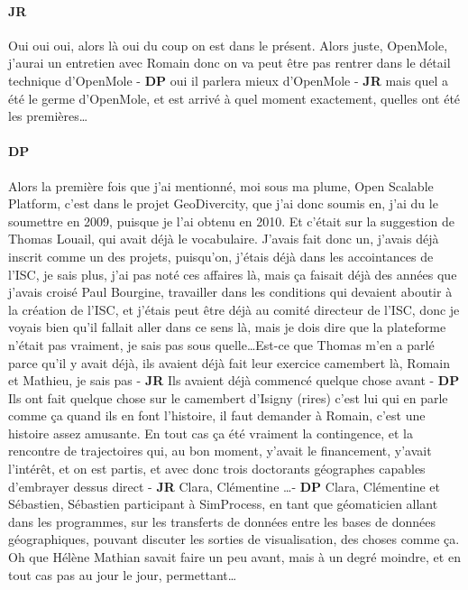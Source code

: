 \documentclass[12pt]{article}
\begin{document}
\paragraph{JR}

Oui oui oui, alors là oui du coup on est dans le présent. Alors juste, OpenMole, j'aurai un entretien avec Romain donc on va peut être pas rentrer dans le détail technique d'OpenMole - \textbf{DP} oui il parlera mieux d'OpenMole - \textbf{JR} mais quel a été le germe d'OpenMole, et est arrivé à quel moment exactement, quelles ont été les premières\ldots 

\paragraph{DP}

Alors la première fois que j'ai mentionné, moi sous ma plume, Open Scalable Platform, c'est dans le projet GeoDivercity, que j'ai donc soumis en, j'ai du le soumettre en 2009, puisque je l'ai obtenu en 2010. Et c'était sur la suggestion de Thomas Louail, qui avait déjà le vocabulaire. J'avais fait donc un, j'avais déjà inscrit comme un des projets, puisqu'on, j'étais déjà dans les accointances de l'ISC, je sais plus, j'ai pas noté ces affaires là, mais ça faisait déjà des années que j'avais croisé Paul Bourgine, travailler dans les conditions qui devaient aboutir à la création de l'ISC, et j'étais peut être déjà au comité directeur de l'ISC, donc je voyais bien qu'il fallait aller dans ce sens là, mais je dois dire que la plateforme n'était pas vraiment, je sais pas sous quelle\ldots Est-ce que Thomas m'en a parlé parce qu'il y avait déjà, ils avaient déjà fait leur exercice camembert là, Romain et Mathieu, je sais pas - \textbf{JR} Ils avaient déjà commencé quelque chose avant - \textbf{DP} Ils ont fait quelque chose sur le camembert d'Isigny (rires) c'est lui qui en parle comme ça quand ils en font l'histoire, il faut demander à Romain, c'est une histoire assez amusante. En tout cas ça été vraiment la contingence, et la rencontre de trajectoires qui, au bon moment, y'avait le financement, y'avait l'intérêt, et on est partis, et avec donc trois doctorants géographes capables d'embrayer dessus direct - \textbf{JR} Clara, Clémentine \ldots - \textbf{DP} Clara, Clémentine et Sébastien, Sébastien participant à SimProcess, en tant que géomaticien allant dans les programmes, sur les transferts de données entre les bases de données géographiques, pouvant discuter les sorties de visualisation, des choses comme ça. Oh que Hélène Mathian savait faire un peu avant, mais à un degré moindre, et en tout cas pas au jour le jour, permettant\ldots 
\end{document}
